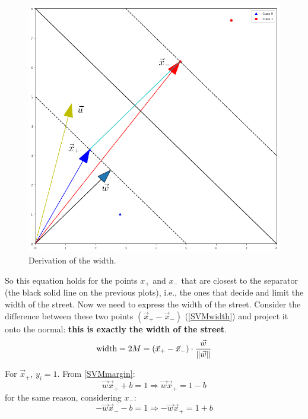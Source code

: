 \begin{figure}
\centering
\includegraphics[scale=0.4]{img/SVMwidth}
\caption{Derivation of the width.}
\label{SVMwidth}
\end{figure}

So this equation holds for the points $x_+$ and $x_-$ that are closest to the separator (the black solid line on the previous plots), i.e., the ones that decide and limit the width of the street. Now we need to express the width of the street. Consider the difference between these two points $(\vec{x}_+ - \vec{x}_-)$ (\autoref{SVMwidth}) and project it onto the normal: \textbf{this is exactly the width of the street}.
\begin{equation}
\begin{aligned}
\text{width} = 2M = \left( \vec{x}_+ - \vec{x}_-\right) \cdot \frac{\vec{w}}{\left\lVert\vec{w}\right\rVert}
\end{aligned}
\label{width0}
\end{equation}

For $\vec{x}_+$, $y_i=1$. From \autoref{SVMmargin}:
\begin{equation}
\vec{w} \vec{x}_+ + b = 1\Rightarrow \vec{w} \vec{x}_+ = 1-b
\end{equation}
for the same reason, considering $x_-$:
\begin{equation}
-\vec{w} \vec{x}_- - b = 1\Rightarrow -\vec{w} \vec{x}_+ = 1+b
\end{equation}

